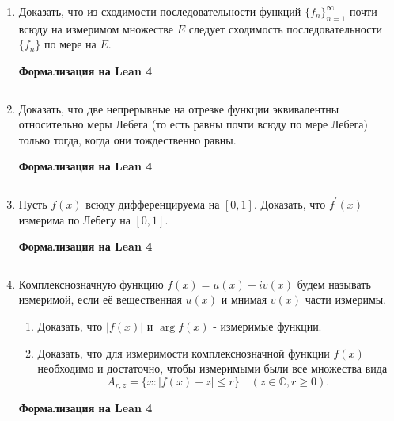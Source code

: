 \documentclass[12pt,a4paper]{article}
\begin{document}
\begin{enumerate}
\newpage
\item Доказать, что из сходимости последовательности функций $\{f_{n}\}_{n=1}^{\infty}$ почти всюду на измеримом множестве $E$ следует сходимость последовательности $\{f_{n}\}$ по мере на $E$.


\begin{center}\small\textbf{Формализация на Lean 4}\end{center}
\inputminted{lean}{FunAn/Section03_MeasurableFunctions/Task06.lean}

\newpage
\item Доказать, что две непрерывные на отрезке функции эквивалентны относительно меры Лебега (то есть равны почти всюду по мере Лебега) только тогда, когда они тождественно равны.


\begin{center}\small\textbf{Формализация на Lean 4}\end{center}
\inputminted{lean}{FunAn/Section03_MeasurableFunctions/Task07.lean}

\newpage
\item Пусть $f(x)$ всюду дифференцируема на $[0,1]$. Доказать, что $f^{\prime}(x)$ измерима по Лебегу на $[0, 1]$.


\begin{center}\small\textbf{Формализация на Lean 4}\end{center}
\inputminted{lean}{FunAn/Section03_MeasurableFunctions/Task08.lean}

\newpage

\item Комплекснозначную функцию $f(x) = u(x) + iv(x)$ будем называть измеримой, если её вещественная $u(x)$ и мнимая $v(x)$ части измеримы.
\begin{enumerate}[label=\alph*)]
\item Доказать, что $|f(x)|$ и $\arg f(x)$ - измеримые функции.
\item Доказать, что для измеримости комплекснозначной функции $f(x)$ необходимо и достаточно, чтобы измеримыми были все множества вида
$$A_{r,z} = \{x : |f(x) - z| \le r\} \quad (z \in \mathbb{C}, r \ge 0).$$
\end{enumerate}

\begin{center}\small\textbf{Формализация на Lean 4}\end{center}
\inputminted{lean}{FunAn/Section03_MeasurableFunctions/Task09.lean}

\end{enumerate}
\end{document}
